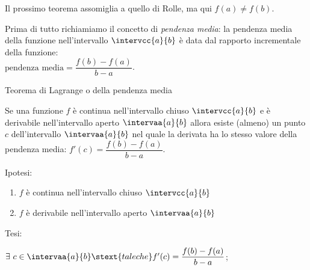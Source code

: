 Il prossimo teorema assomiglia a quello di Rolle, ma qui \(f(a) \neq f(b)\).

Prima di tutto richiamiamo il concetto di \emph{pendenza media}: la pendenza 
media della funzione nell'intervallo \(\intervcc{a}{b}\) 
è data dal rapporto incrementale della funzione: \\
\(\text{pendenza media} = \dfrac{f(b)-f(a)}{b-a}\).


\begin{newtheo}{Teorema di Lagrange o della pendenza media}{}

Se una funzione \(f\) è continua nell'intervallo chiuso \(\intervcc{a}{b}\) 
e è derivabile nell'intervallo aperto \(\intervaa{a}{b}\) allora
esiste (almeno) un punto \(c\) dell'intervallo \(\intervaa{a}{b}\) nel quale 
la derivata ha lo stesso valore della 
pendenza media: \qquad 
\(f'(c) = \dfrac{f(b)-f(a)}{b-a}\).

\end{newtheo}

\vspace*{-35mm}                           %
\begin{minipage}{.54\textwidth}
\noindent Ipotesi:
\begin{enumerate}[nosep]
 \item \(f\) è continua 
 nell'intervallo chiuso \(\intervcc{a}{b}\)
 \item \(f\) è derivabile 
 nell'intervallo aperto \(\intervaa{a}{b}\)
\end{enumerate}

\noindent Tesi: 

\hspace{4mm}\(\exists~c \in \intervaa{a}{b} \stext{ tale che } 
f'(c)=\dfrac{f(b)-f(a)}{b-a}\);
\end{minipage}
\hfill
\begin{minipage}{.42\textwidth}
\begin{center} \tlagrange \end{center}
\end{minipage}

\vspace{-15mm}                           %

